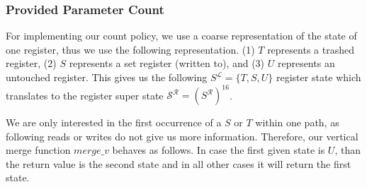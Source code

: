 
%
%

\subsubsection{Provided Parameter Count}
\label{subsection:providedparamcount}
For implementing our {count} policy, we use a coarse representation of the state of one register, thus we use the following representation.
(1) $T$ represents a trashed register,
(2) $S$ represents a set register (written to), and
(3) $U$ represents an untouched register.
This gives us the following $S^\mathcal{L} = \{ T, S, U \}$  register state which translates to the register super state $\mathcal{S}^\mathcal{R} = (S^\mathcal{R})^{16}$.

We are only interested in the first occurrence of a $S$ or $T$ within one path, as following reads or writes do not give us more information. Therefore, our vertical 
merge function $merge\_v$ behaves as follows. In case the first given state is $U$, than the return value is the second state and in all other cases it will return the first state.
%


